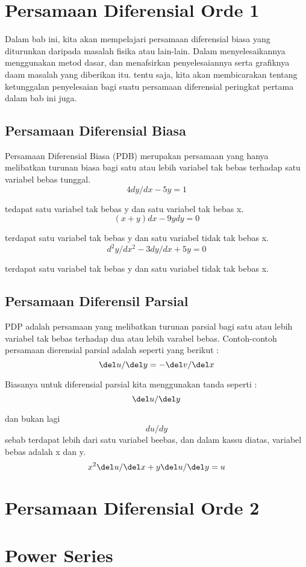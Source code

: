 \documentclass{book}
\begin{document}
\chapter{Persamaan Diferensial Orde 1}
\par Dalam bab ini, kita akan mempelajari persamaan diferensial biasa yang diturunkan daripada masalah fisika atau lain-lain. Dalam menyelesaikannya menggunakan metod dasar, dan menafsirkan penyelesaiannya serta grafiknya  daam masalah yang diberikan itu. tentu saja, kita akan membicarakan tentang ketunggalan penyelesaian bagi  suatu persamaan diferensial peringkat pertama dalam bab ini juga.
\section{Persamaan Diferensial Biasa}
\par Persamaan Diferensial Biasa (PDB) merupakan persamaan yang hanya melibatkan turunan biasa bagi satu atau  lebih variabel tak bebas terhadap satu variabel bebas tunggal.
\begin{equation}
4 dy/dx - 5y = 1
\label{eq:pdb1}
\end{equation}
\par tedapat satu variabel tak bebas y dan satu variabel tak bebas x.
\begin{equation}
(x + y) dx - 9 y dy = 0
\end{equation}
\par terdapat satu variabel tak bebas y dan satu variabel tidak tak bebas x.
\begin{equation}
d^2y/dx^2 - 3 dy/dx + 5y = 0
\end{equation}
\par terdapat satu variabel tak bebas y dan satu variabel tidak tak bebas x.
\section{Persamaan Diferensil Parsial}
\par PDP adalah persamaan yang melibatkan turunan parsial bagi satu atau lebih variabel tak bebas terhadap dua atau lebih varabel bebas. Contoh-contoh persamaan dierensial parsial adalah seperti yang berikut :
\begin{equation}
{\del u}/{\del y} = - {\del v}/{\del x}
\end{equation}
\par Biasanya untuk diferensial parsial kita menggunakan tanda seperti :
\begin{equation}
{\del u}/{\del y}
\end{equation}
\par dan bukan lagi
\begin{equation}
du/dy
\end{equation}
sebab terdapat lebih dari satu variabel  beebas, dan dalam kassu diatas, variabel bebas adalah x dan y.
\begin{equation}
x^2 {\del u}/{\del x} + y {\del u}/{\del y} = u
\end{equation}
\chapter{Persamaan Diferensial Orde 2}
\chapter{Power Series}
\end{document}
